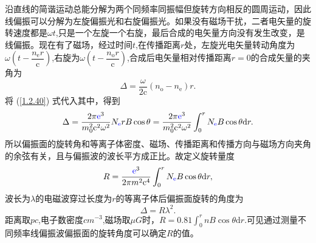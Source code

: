 \documentclass[../天体物理基础.tex]{subfiles}
\begin{document}
沿直线的简谐运动总能分解为两个同频率同振幅但旋转方向相反的圆周运动，因此线偏振可以分解为左旋偏振光和右旋偏振光。如果没有磁场干扰，二者电矢量的旋转速度都是$\omega t$,只是一个左旋一个右旋，最后合成的电矢量方向没有发生改变，是线偏振。现在有了磁场，经过时间$t$,在传播距离$r$处，左旋光电矢量转动角度为$\omega\left(t-\dfrac{n_{\text{e}}r}{\mathrm{c}}\right)$,右旋为$\omega\left(t-\dfrac{n_{\text{o}}r}{\mathrm{c}}\right)$,合成后电矢量相对传播距离$r=0$的合成矢量的夹角为
\begin{equation}
\Delta{}=\frac{\omega}{2\mathrm{c}}\left(n_{\text{o}}-n_{\text{e}}\right)r.
\end{equation}
将 (\ref{1.2.40}) 式代入其中，得到
\begin{equation}
\Delta{}=\frac{2\pi{\color{blue}{\ce{e}}}^{3}}{m_{0}^{2}\mathrm{c}^{2}\omega^{2}}N_{{\color{blue}{\ce{e}}}}rB\cos\theta=\frac{2\pi{\color{blue}{\ce{e}}}^{3}}{m_{0}^{2}\mathrm{c}^{2}\omega^{2}}\int_{0}^{r}N_{{\color{blue}{\ce{e}}}}B\cos\theta\mathrm{d}r.
\end{equation}
所以偏振面的旋转角和等离子体密度、磁场、传播距离和传播方向与磁场方向夹角的余弦有关，且与偏振波的波长平方成正比。故定义旋转量度
\begin{equation}
R=\frac{{\color{blue}{\ce{e}}}^{3}}{2\pi m^{2}\mathrm{c}^{4}}\int_{0}^{r}N_{{\color{blue}{\ce{e}}}}B\cos\theta\mathrm{d}r,
\end{equation}
波长为$\lambda$的电磁波穿过长度为$r$的等离子体后偏振面旋转的角度为
\begin{equation}
\Delta{}=R\lambda^{2}.
\end{equation}
距离取$\unit{pc}$,电子数密度$\unit{cm^{-3}}$,磁场取$\unit{\mu G}$时，$R=0.81\int_{0}^{r}nB\cos\theta\mathrm{d}r$.可见通过测量不同频率线偏振波偏振面的旋转角度可以确定$R$的值。
\end{document}
